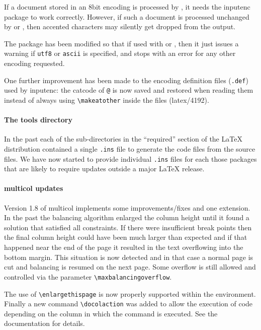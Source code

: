 \documentclass{ltnews}
\begin{document}
If a document stored in an 8bit encoding is processed by
, it needs the \textsf{inputenc} package to work
correctly. However, if such a document is processed unchanged by
 or , then accented characters may
silently get dropped from the output.

The package has been modified so that if used with  or
, then it just issues a warning if \texttt{utf8} or
\texttt{ascii} is specified, and stops with an error for any other
encoding requested.



One further improvement has been made to the encoding definition files
(\texttt{.def}) used by \textsf{inputenc}: the catcode of \texttt{@}
is now saved and restored when reading them instead of always using
\verb=\makeatother= inside the files (latex/4192).



\paragraph{The tools directory}

In the past each of the sub-directories in the ``required'' section of
the \LaTeX{} distribution contained a single \texttt{.ins} file to
generate the code files from the source files. We have now
started to provide individual \texttt{.ins} files for each those
packages that are likely to require updates outside a major
\LaTeX{} release.

\paragraph{\textsf{multicol} updates}

Version 1.8 of \textsf{multicol} implements some improvements/fixes
and one extension. In the past the balancing algorithm enlarged the
column height until it found a solution that satisfied all
constraints. If there were insufficient break points then the final
column height could have been much larger than expected and if that
happened near the end of the page it resulted in the text overflowing
into the bottom margin. This situation is now detected and in that
case a normal page is cut and balancing is resumed on the next
page. Some overflow is still allowed and controlled via the parameter
\verb=\maxbalancingoverflow=.

The use of \verb=\enlargethispage= is now properly supported within
the environment. Finally a new command \verb=\docolaction= was added
to allow the execution of code depending on the column in which the
command is executed. See the documentation for details.
\end{document}
